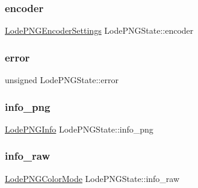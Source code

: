 \subsubsection{\texorpdfstring{encoder}{encoder}}
{\footnotesize\ttfamily \mbox{\hyperlink{struct_lode_p_n_g_encoder_settings}{Lode\+P\+N\+G\+Encoder\+Settings}} Lode\+P\+N\+G\+State\+::encoder}

\mbox{\label{struct_lode_p_n_g_state_a1a00a050da588cf3c2b7a6252bebb0cd}} 
\subsubsection{\texorpdfstring{error}{error}}
{\footnotesize\ttfamily unsigned Lode\+P\+N\+G\+State\+::error}

\mbox{\label{struct_lode_p_n_g_state_a08d9ac43c995fcf34d72b1d37047b6fa}} 
\subsubsection{\texorpdfstring{info\_png}{info\_png}}
{\footnotesize\ttfamily \mbox{\hyperlink{struct_lode_p_n_g_info}{Lode\+P\+N\+G\+Info}} Lode\+P\+N\+G\+State\+::info\+\_\+png}

\mbox{\label{struct_lode_p_n_g_state_a597bc08de787147474d43adf8b6ceacf}} 
\subsubsection{\texorpdfstring{info\_raw}{info\_raw}}
{\footnotesize\ttfamily \mbox{\hyperlink{struct_lode_p_n_g_color_mode}{Lode\+P\+N\+G\+Color\+Mode}} Lode\+P\+N\+G\+State\+::info\+\_\+raw}

